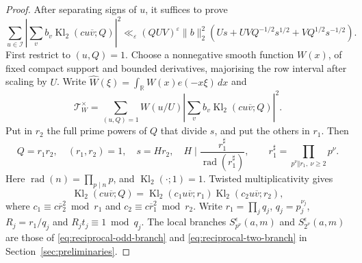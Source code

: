 \documentclass[12pt, a4paper]{amsart}
\numberwithin{equation}{section}
\newcommand{\e}{e}
\newcommand{\ep}{\varepsilon}
\newcommand{\R}{\mathbb{R}}
\renewcommand{\bar}[1]{\overline{#1}}
\renewcommand{\ge}{\geqslant}
\theoremstyle{plain}
\begin{document}
\begin{proof}
After separating signs of $u$, it suffices to prove
\begin{equation}\label{eq:reciprocal-mean-square}
\sum_{u\in\mathcal I}
 \left|\sum_v b_v\operatorname{Kl}_2(cu\bar v;Q)\right|^2
\ll_\ep (QUV)^\ep\|b\|_2^2
 \left(Us+UVQ^{-1/2}s^{1/2}
       +VQ^{1/2}s^{-1/2}\right).
\end{equation}
First restrict to $(u,Q)=1$. Choose a nonnegative smooth function $W(x)$, of fixed compact support and bounded derivatives, majorising the row interval after scaling by $U$. Write $\widehat W(\xi)=\int_\R W(x)\e(-x\xi)\,dx$ and
$$
 \mathcal T_W^\times=
 \sum_{(u,Q)=1}W(u/U)
 \left|\sum_vb_v\operatorname{Kl}_2(cu\bar v;Q)\right|^2.
$$
Put in $r_2$ the full prime powers of $Q$ that divide $s$, and put the others in $r_1$. Then
\begin{equation}\label{eq:reciprocal-r1-r2-H}
 Q=r_1r_2,\quad (r_1,r_2)=1,\quad s=Hr_2,\quad
 H\mid \frac{r_1^\sharp}{\operatorname{rad}(r_1^\sharp)},
 \qquad
 r_1^\sharp=\prod_{p^\nu\Vert r_1,\ \nu\ge2}p^\nu.
\end{equation}
Here $\operatorname{rad}(n)=\prod_{p\mid n}p$, and $\operatorname{Kl}_2(\cdot;1)=1$. Twisted multiplicativity gives
\begin{equation}\label{eq:reciprocal-Kl-factorisation}
 \operatorname{Kl}_2(cu\bar v;Q)
 =\operatorname{Kl}_2(c_1u\bar v;r_1)
  \operatorname{Kl}_2(c_2u\bar v;r_2),
\end{equation}
where $c_1\equiv c\bar r_2^{2}\bmod {r_1}$ and $c_2\equiv c\bar r_1^{2}\bmod {r_2}$. Write $r_1=\prod_jq_j$, $q_j=p_j^{\nu_j}$, $R_j=r_1/q_j$ and $R_jt_j\equiv1\bmod {q_j}$. The local branches $S^{\epsilon}_{p^\nu}(a,m)$ and $S^{\epsilon}_{2^\nu}(a,m)$ are those of \eqref{eq:reciprocal-odd-branch} and \eqref{eq:reciprocal-two-branch} in Section~\ref{sec:preliminaries}.


\end{proof}
\end{document}
